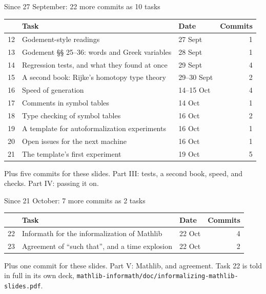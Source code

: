 \documentclass[10pt,aspectratio=169]{beamer}
\begin{document}
\begin{frame}{Since 27 September: 22 more commits as 10 tasks}
  \footnotesize
  \begin{tabular}{rllr}
    \toprule
    & \textbf{Task} & \textbf{Date} & \textbf{Commits} \\
    \midrule
    12 & Godement-style readings & 27 Sept & 1 \\
    13 & Godement §§ 25--36: words and Greek variables & 28 Sept & 1 \\
    \midrule
    14 & Regression tests, and what they found at once & 29 Sept & 4 \\
    15 & A second book: Rijke's homotopy type theory & 29--30 Sept & 2 \\
    16 & Speed of generation & 14--15 Oct & 4 \\
    17 & Comments in symbol tables & 14 Oct & 1 \\
    18 & Type checking of symbol tables & 16 Oct & 2 \\
    \midrule
    19 & A template for autoformalization experiments & 16 Oct & 1 \\
    20 & Open issues for the next machine & 16 Oct & 1 \\
    21 & The template's first experiment & 19 Oct & 5 \\
    \bottomrule
  \end{tabular}

  \vspace{0.5em}
  Plus five commits for these slides. \quad
  Part III: tests, a second book, speed, and checks. \quad Part IV: passing it on.
\end{frame}

\begin{frame}{Since 21 October: 7 more commits as 2 tasks}
  \footnotesize
  \begin{tabular}{rllr}
    \toprule
    & \textbf{Task} & \textbf{Date} & \textbf{Commits} \\
    \midrule
    22 & Informath for the informalization of Mathlib & 22 Oct & 4 \\
    23 & Agreement of ``such that'', and a time explosion & 22 Oct & 2 \\
    \bottomrule
  \end{tabular}

  \vspace{0.5em}
  Plus one commit for these slides. \quad Part V: Mathlib, and agreement.
  \quad Task 22 is told in full in its own deck,
  \texttt{mathlib-informath/doc/informalizing-mathlib-slides.pdf}.
\end{frame}
\end{document}
